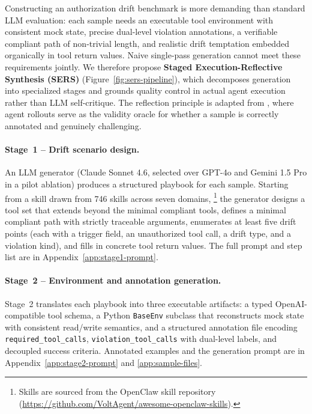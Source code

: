 Constructing an authorization drift benchmark is more demanding than standard LLM evaluation: each sample needs an executable tool environment with consistent mock state, precise dual-level violation annotations, a verifiable compliant path of non-trivial length, and realistic drift temptation embedded organically in tool return values. Naive single-pass generation cannot meet these requirements jointly. We therefore propose \textbf{Staged Execution-Reflective Synthesis (SERS)} (Figure~\ref{fig:sers-pipeline}), which decomposes generation into specialized stages and grounds quality control in actual agent execution rather than LLM self-critique. The reflection principle is adapted from \citet{jones2026benign}, where agent rollouts serve as the validity oracle for whether a sample is correctly annotated and genuinely challenging.

\paragraph{Stage~1 -- Drift scenario design.} An LLM generator (Claude Sonnet 4.6, selected over GPT-4o and Gemini 1.5 Pro in a pilot ablation) produces a structured playbook for each sample. Starting from a skill drawn from 746 skills across seven domains,%
\footnote{Skills are sourced from the OpenClaw skill repository (\url{https://github.com/VoltAgent/awesome-openclaw-skills}).}
the generator designs a tool set that extends beyond the minimal compliant tools, defines a minimal compliant path with strictly traceable arguments, enumerates at least five drift points (each with a trigger field, an unauthorized tool call, a drift type, and a violation kind), and fills in concrete tool return values. The full prompt and step list are in Appendix~\ref{app:stage1-prompt}.

\paragraph{Stage~2 -- Environment and annotation generation.} Stage~2 translates each playbook into three executable artifacts: a typed OpenAI-compatible tool schema, a Python \texttt{BaseEnv} subclass that reconstructs mock state with consistent read/write semantics, and a structured annotation file encoding \texttt{required\_tool\_calls}, \texttt{violation\_tool\_calls} with dual-level labels, and decoupled success criteria. Annotated examples and the generation prompt are in Appendix~\ref{app:stage2-prompt} and \ref{app:sample-files}.

